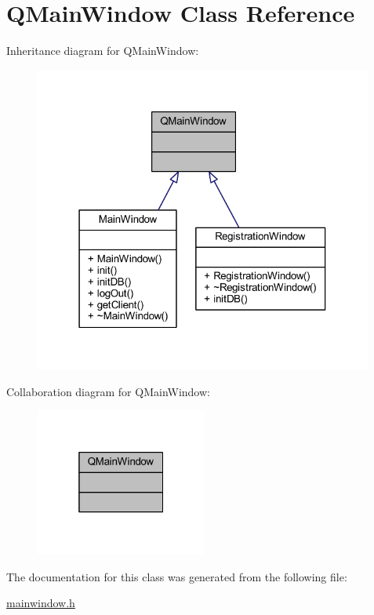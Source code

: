 \hypertarget{class_q_main_window}{}\section{Q\+Main\+Window Class Reference}
\label{class_q_main_window}


Inheritance diagram for Q\+Main\+Window\+:
\nopagebreak
\begin{figure}[H]
\begin{center}
\leavevmode
\includegraphics[width=316pt]{class_q_main_window__inherit__graph}
\end{center}
\end{figure}


Collaboration diagram for Q\+Main\+Window\+:
\nopagebreak
\begin{figure}[H]
\begin{center}
\leavevmode
\includegraphics[width=160pt]{class_q_main_window__coll__graph}
\end{center}
\end{figure}


The documentation for this class was generated from the following file\+:\begin{DoxyCompactItemize}
\item 
\hyperlink{mainwindow_8h}{mainwindow.\+h}\end{DoxyCompactItemize}
